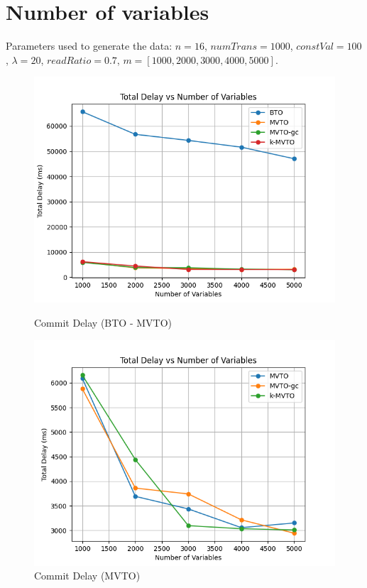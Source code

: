 \documentclass[12pt]{article}
\begin{document}
\section*{Number of variables}
Parameters used to generate the data:
$n=16$, $numTrans=1000$, $constVal=100$, $\lambda=20$, $readRatio=0.7$, $m = [1000, 2000, 3000, 4000, 5000]$.
\begin{figure}[h]
    \centering
    \begin{minipage}[b]{0.45\textwidth}
        \includegraphics[width=\textwidth]{./images/VarTD.png}
        \caption{Commit Delay (BTO - MVTO)}
        \label{fig:varTD}
    \end{minipage}
    \hfill
    \begin{minipage}[b]{0.45\textwidth}
        \includegraphics[width=\textwidth]{./images/MVTOvarTD.png}
        \caption{Commit Delay (MVTO)}
        \label{fig:MVTOvarTD}
    \end{minipage}
\end{figure}\\
\end{document}
